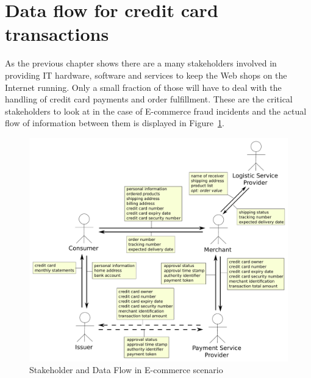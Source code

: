 
\section{Data flow for credit card transactions}
\label{sec:stakeholder_data_flow}

As the previous chapter shows there are a many stakeholders involved in providing IT hardware, software and services to keep the Web shops on the Internet running. Only a small fraction of those will have to deal with the handling of credit card payments and order fulfillment. These are the critical stakeholders to look at in the case of E-commerce fraud incidents and the actual flow of information between them is displayed in  Figure~\ref{fig:images_e_commerce_stakeholder}. \@

\begin{figure}[H]
	\centering
		\includegraphics[width=0.8\columnwidth]{images/e-commerce-stakeholder.pdf}
	\caption{Stakeholder and Data Flow in E-commerce scenario}
\label{fig:images_e_commerce_stakeholder}
\end{figure}
